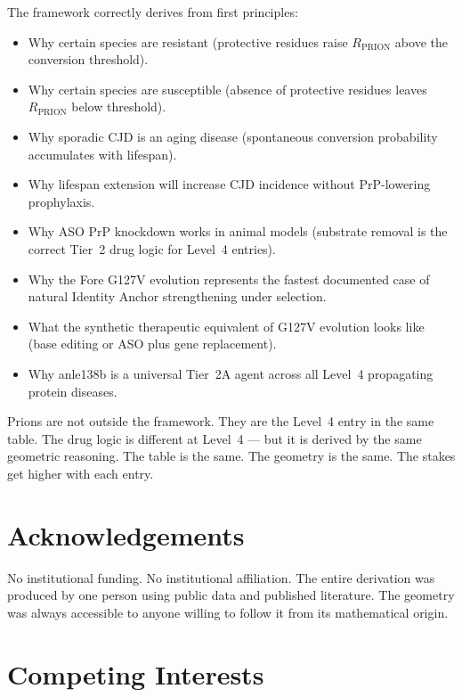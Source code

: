 \documentclass[12pt,a4paper]{article}
\newcommand{\rprion}{$R_{\mathrm{PRION}}$}
\begin{document}
The framework correctly derives from first principles:
\begin{itemize}
  \item Why certain species are resistant (protective residues raise
    \rprion{} above the conversion threshold).
  \item Why certain species are susceptible (absence of protective residues
    leaves \rprion{} below threshold).
  \item Why sporadic CJD is an aging disease (spontaneous conversion
    probability accumulates with lifespan).
  \item Why lifespan extension will increase CJD incidence without
    PrP-lowering prophylaxis.
  \item Why ASO PrP knockdown works in animal models (substrate removal is
    the correct Tier~2 drug logic for Level~4 entries).
  \item Why the Fore G127V evolution represents the fastest documented case
    of natural Identity Anchor strengthening under selection.
  \item What the synthetic therapeutic equivalent of G127V evolution looks
    like (base editing or ASO plus gene replacement).
  \item Why anle138b is a universal Tier~2A agent across all Level~4
    propagating protein diseases.
\end{itemize}

\vspace{1em}

\noindent Prions are not outside the framework. They are the Level~4 entry
in the same table. The drug logic is different at Level~4 --- but it is
derived by the same geometric reasoning. The table is the same. The geometry
is the same. The stakes get higher with each entry.

\section*{Acknowledgements}

No institutional funding. No institutional affiliation. The entire derivation
was produced by one person using public data and published literature.
The geometry was always accessible to anyone willing to follow it from its
mathematical origin.

\section*{Competing Interests}
\end{document}
